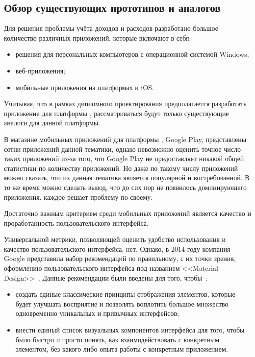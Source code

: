 \subsection{Обзор существующих прототипов и аналогов}
\label{sec:analysis:analogues}

Для решения проблемы учёта доходов и расходов разработано большое количество различных приложений, которые включают в себя:
\begin{itemize}
    \item решения для персональных компьютеров с операционной системой Windows;
    \item веб-приложения;
    \item мобильные приложения на платформах \andro и iOS\@.
\end{itemize}

Учитывая, что в рамках дипломного проектирования предполагается разработать приложение для платформы \andro, рассматриваться будут только существующие аналоги для данной платформы.

В магазине мобильных приложений для платформы \andro, Google Play, представлены сотни приложений данной тематики, однако невозможно оценить точное число таких приложений из-за того, что Google Play не предоставляет никакой общей статистики по количеству приложений.
Но даже по такому числу приложений можно сказать, что их данная тематика является популярной и востребованной.
В то же время можно сделать вывод, что до сих пор не появилось доминирующего приложения, каждое решает проблему по-своему.

Достаточно важным критерием среди мобильных приложений является качество и проработанность пользовательского интерфейса.

Универсальной метрики, позволяющей оценить удобство использования и качество пользовательского интерфейса, нет.
Однако, в 2014 году компания Google представила набор рекомендаций по правильному, с их точки зрения, оформлению пользовательского интерфейса под названием <<Material Design>>~\cite{google_material_news}.
Данные рекомендации были введены для того, чтобы~\cite{google_material_guidelines}:
\begin{itemize}
    \item создать единые классические принципы отображения элементов, которые будет улучшать восприятие и позволять воплотить большое множество одновременно уникальных и привычных интерфейсов;
    \item внести единый список визуальных компонентов интерфейса для того, чтобы было быстро и просто понять, как взаимодействовать с конкретным элементом, без какого либо опыта работы с конкретным приложением.
\end{itemize}

